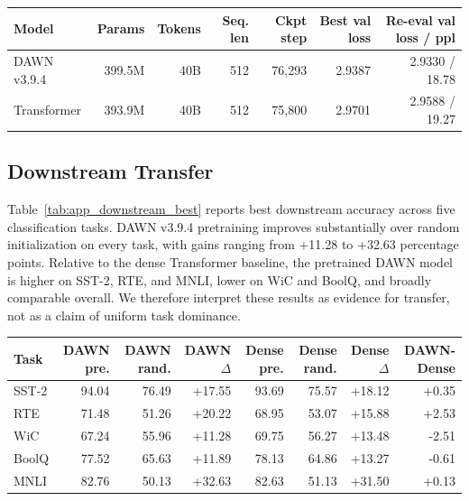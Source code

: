 \documentclass{article}
\begin{document}
\begin{center}
\small
\setlength{\tabcolsep}{6pt}
\renewcommand{\arraystretch}{1.10}
\begin{tabular}{lrrrrrr}
\toprule
Model & Params & Tokens & Seq. len & Ckpt step & Best val loss & Re-eval val loss / ppl \\
\midrule
DAWN v3.9.4 & 399.5M & 40B & 512 & 76{,}293 & 2.9387 & 2.9330 / 18.78 \\
Transformer & 393.9M & 40B & 512 & 75{,}800 & 2.9701 & 2.9588 / 19.27 \\
\bottomrule
\end{tabular}
\label{tab:app_checkpoint_summary}
\end{center}

\subsection{Downstream Transfer}

Table~\ref{tab:app_downstream_best} reports best downstream accuracy across five classification tasks. DAWN v3.9.4 pretraining improves substantially over random initialization on every task, with gains ranging from +11.28 to +32.63 percentage points. Relative to the dense Transformer baseline, the pretrained DAWN model is higher on SST-2, RTE, and MNLI, lower on WiC and BoolQ, and broadly comparable overall. We therefore interpret these results as evidence for transfer, not as a claim of uniform task dominance.

\begin{center}
\small
\setlength{\tabcolsep}{7pt}
\renewcommand{\arraystretch}{1.10}
\begin{tabular}{lrrrrrrr}
\toprule
Task & DAWN pre. & DAWN rand. & DAWN $\Delta$ & Dense pre. & Dense rand. & Dense $\Delta$ & DAWN-Dense \\
\midrule
SST-2 & 94.04 & 76.49 & +17.55 & 93.69 & 75.57 & +18.12 & +0.35 \\
RTE & 71.48 & 51.26 & +20.22 & 68.95 & 53.07 & +15.88 & +2.53 \\
WiC & 67.24 & 55.96 & +11.28 & 69.75 & 56.27 & +13.48 & -2.51 \\
BoolQ & 77.52 & 65.63 & +11.89 & 78.13 & 64.86 & +13.27 & -0.61 \\
MNLI & 82.76 & 50.13 & +32.63 & 82.63 & 51.13 & +31.50 & +0.13 \\
\bottomrule
\end{tabular}
\label{tab:app_downstream_best}
\end{center}
\end{document}
